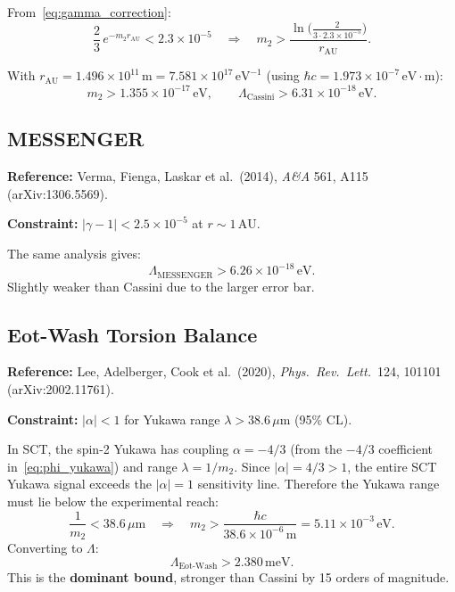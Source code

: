 \documentclass[11pt,a4paper]{article}
\begin{document}
From~\eqref{eq:gamma_correction}:
\begin{equation}
  \frac{2}{3}\,e^{-m_2 r_{\mathrm{AU}}} < 2.3 \times 10^{-5}
  \quad\Longrightarrow\quad
  m_2 > \frac{\ln\!\bigl(\tfrac{2}{3 \cdot 2.3 \times 10^{-5}}\bigr)}{r_{\mathrm{AU}}}.
\end{equation}

With $r_{\mathrm{AU}} = 1.496 \times 10^{11}\,\mathrm{m}
= 7.581 \times 10^{17}\,\mathrm{eV}^{-1}$ (using $\hbar c = 1.973 \times 10^{-7}\,\mathrm{eV}\!\cdot\!\mathrm{m}$):
\begin{equation}
  m_2 > 1.355 \times 10^{-17}\,\mathrm{eV}, \qquad
  \boxed{\Lambda_{\mathrm{Cassini}} > 6.31 \times 10^{-18}\,\mathrm{eV}.}
\end{equation}

\subsection{MESSENGER}

\textbf{Reference:} Verma, Fienga, Laskar et al.\ (2014),
\textit{A\&A} 561, A115 (arXiv:1306.5569).

\textbf{Constraint:} $|\gamma - 1| < 2.5 \times 10^{-5}$ at $r \sim 1\,\mathrm{AU}$.

The same analysis gives:
\begin{equation}
  \Lambda_{\mathrm{MESSENGER}} > 6.26 \times 10^{-18}\,\mathrm{eV}.
\end{equation}
Slightly weaker than Cassini due to the larger error bar.

\subsection{Eot-Wash Torsion Balance}

\textbf{Reference:} Lee, Adelberger, Cook et al.\ (2020),
\textit{Phys.\ Rev.\ Lett.}\ 124, 101101 (arXiv:2002.11761).

\textbf{Constraint:} $|\alpha| < 1$ for Yukawa range $\lambda > 38.6\,\mu\mathrm{m}$
(95\% CL).

In SCT, the spin-2 Yukawa has coupling $\alpha = -4/3$ (from the $-4/3$
coefficient in~\eqref{eq:phi_yukawa}) and range $\lambda = 1/m_2$.
Since $|\alpha| = 4/3 > 1$, the entire SCT Yukawa signal exceeds the
$|\alpha| = 1$ sensitivity line.  Therefore the Yukawa range must lie
below the experimental reach:
\begin{equation}
  \frac{1}{m_2} < 38.6\,\mu\mathrm{m}
  \quad\Longrightarrow\quad
  m_2 > \frac{\hbar c}{38.6 \times 10^{-6}\,\mathrm{m}}
  = 5.11 \times 10^{-3}\,\mathrm{eV}.
\end{equation}
Converting to $\Lambda$:
\begin{equation}
  \boxed{\Lambda_{\mathrm{Eot\text{-}Wash}} > 2.380\,\mathrm{meV}.}
\end{equation}
This is the \textbf{dominant bound}, stronger than Cassini by 15 orders
of magnitude.
\end{document}
